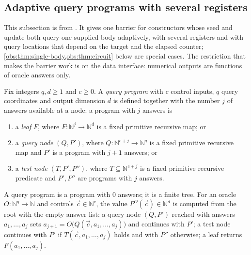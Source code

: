 \subsection{Adaptive query programs with several registers}
\label{obs:sec:programs}

This subsection is from . It gives one barrier for
constructors whose seed and update both query one supplied body adaptively, with
several registers and with query locations that depend on the target and the
elapsed counter; \cref{obs:thm:single-body,obs:thm:circuit} below are special
cases. The restriction that makes the barrier work is on the data interface:
numerical outputs are functions of oracle answers only.

\begin{definition}
\label{obs:def:programs}
Fix integers $q,d\ge 1$ and $c\ge 0$. A \emph{query program} with $c$ control
inputs, $q$ query coordinates and output dimension $d$ is defined together with
the number $j$ of answers available at a node: a program with $j$ answers is
\begin{enumerate}[label=(\alph*)]
\item a \emph{leaf} $F$, where $F\colon\mathbb{N}^j\to\mathbb{N}^d$ is a fixed
primitive recursive map; or
\item a \emph{query node} $(Q,P')$, where $Q\colon\mathbb{N}^{c+j}\to\mathbb{N}^q$
is a fixed primitive recursive map and $P'$ is a program with $j+1$ answers; or
\item a \emph{test node} $(T,P',P'')$, where $T\subseteq\mathbb{N}^{c+j}$ is a
fixed primitive recursive predicate and $P',P''$ are programs with $j$ answers.
\end{enumerate}
A query program is a program with $0$ answers; it is a finite tree. For an oracle
$O\colon\mathbb{N}^q\to\mathbb{N}$ and controls $\vec c\in\mathbb{N}^c$, the
value $P^{O}(\vec c)\in\mathbb{N}^d$ is computed from the root with the empty
answer list: a query node $(Q,P')$ reached with answers $a_1,\dots,a_j$ sets
$a_{j+1}=O\bigl(Q(\vec c,a_1,\dots,a_j)\bigr)$ and continues with $P'$; a test
node continues with $P'$ if $T(\vec c,a_1,\dots,a_j)$ holds and with $P''$
otherwise; a leaf returns $F(a_1,\dots,a_j)$.


\end{definition}
